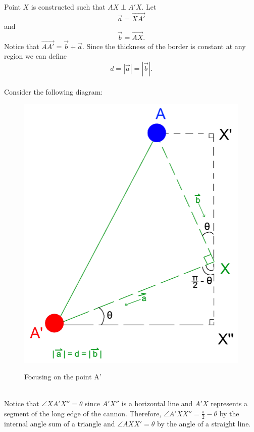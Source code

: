 \documentclass{article}
\begin{document}
Point $X$ is constructed such that $AX \perp A'X$. Let $$\vec{a} = \overrightarrow{XA'}$$ and $$\vec{b} = \overrightarrow{AX}.$$ Notice that $\overrightarrow{AA'} = \vec{b} + \vec{a}$. Since the thickness of the border is constant at any region we can define $$d = |\vec{a}| = |\vec{b}|.$$
\vspace{\baselineskip}\\
Consider the following diagram:\\
\begin{figure}[h]
	\centering
	\includegraphics[scale=0.2]{Images/FindingOuterCornersOfCannon_2.png}\\
	\caption{Focusing on the point A'}
\end{figure}\\
Notice that $\angle XA'X'' = \theta$ since $A'X''$ is a horizontal line and $A'X$ represents a segment of the long edge of the cannon. Therefore, $\angle A'XX'' = \frac{\pi}{2} - \theta$ by the internal angle sum of a triangle and $\angle AXX' = \theta$ by the angle of a straight line. \vspace{\baselineskip}\\
\end{document}
